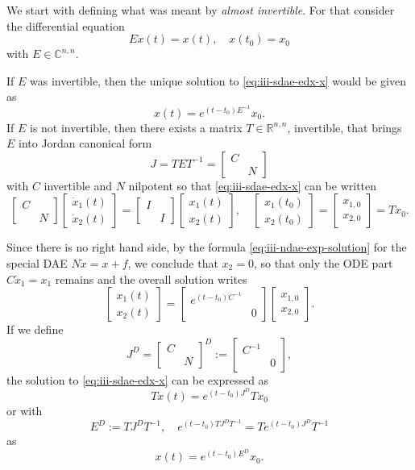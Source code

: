 \documentclass[]{book}
\theoremstyle{definition}
\theoremstyle{definition}
\theoremstyle{definition}
\theoremstyle{definition}
\theoremstyle{remark}
\begin{document}
We start with defining what was meant by \emph{almost invertible}. For that consider the differential equation
\[
E\dot x(t) = x(t), \quad x(t_0) = x_0 \label{eq:iii-sdae-edx-x}
\]
with \(E\in \mathbb C^{n,n}\).

If \(E\) was invertible, then the unique solution to \eqref{eq:iii-sdae-edx-x} would be given as
\[
x(t) = e^{(t-t_0)E^{-1}}x_0.
\]
If \(E\) is not invertible, then there exists a matrix \(T\in \mathbb R^{n,n}\), invertible, that brings \(E\) into Jordan canonical form
\[
J=TET^{-1}=
\begin{bmatrix}
C \\ & N
\end{bmatrix}
\]
with \(C\) invertible and \(N\) nilpotent so that \eqref{eq:iii-sdae-edx-x} can be written
\[
\begin{bmatrix}
C \\ & N
\end{bmatrix}
\begin{bmatrix}
\dot x_1(t) \\ \dot x_2(t)
\end{bmatrix}
=
\begin{bmatrix}
I \\ & I
\end{bmatrix}
\begin{bmatrix}
x_1(t) \\ x_2(t)
\end{bmatrix},
\quad 
\begin{bmatrix}
 x_1(t_0) \\ x_2(t_0)
\end{bmatrix}
=
\begin{bmatrix}
 x_{1,0} \\ x_{2,0}
\end{bmatrix}
=Tx_0.
\]

Since there is no right hand side, by the formula \eqref{eq:iii-ndae-exp-solution} for the special DAE \(N\dot x=x+f\), we conclude that \(x_2=0\), so that only the ODE part \(C\dot x_1 = x_1\) remains and the overall solution writes
\[
\begin{bmatrix}
x_1(t) \\ x_2(t)
\end{bmatrix}=
\begin{bmatrix}
e^{(t-t_0)C^{-1}} \\ & 0
\end{bmatrix}
\begin{bmatrix}
 x_{1,0} \\ x_{2,0}
\end{bmatrix}.
\]
If we define
\[
J^D = 
\begin{bmatrix}
C \\ & N
\end{bmatrix}^D
:=
\begin{bmatrix}
C^{-1} \\ & 0
\end{bmatrix},
\]
the solution to \eqref{eq:iii-sdae-edx-x} can be expressed as
\[
Tx(t) = e^{(t-t_0)J^D}Tx_0
\]
or with
\[
E^D := TJ^{D}T^{-1}, \quad e^{(t-t_0)TJ^{D}T^{-1}} = Te^{(t-t_0)J^{D}}T^{-1}
\]
as
\[
x(t) = e^{(t-t_0)E^D}x_0.
\]
\end{document}
